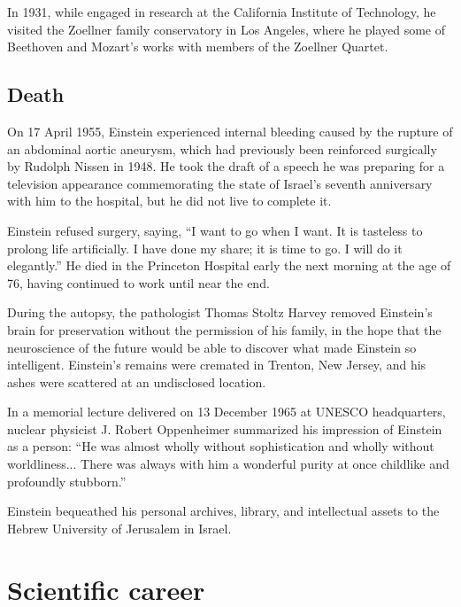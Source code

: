 \documentclass[twoside]{memoir}
\begin{document}
In 1931, while engaged in research at the California Institute of Technology,  he visited the Zoellner family conservatory in Los Angeles, where he played some of Beethoven and Mozart's works with members of the Zoellner Quartet.\cite{Times}

\chapter{Death}\label{death}

On 17 April 1955, Einstein experienced internal bleeding caused by the rupture of an abdominal aortic aneurysm, which had previously been reinforced surgically by Rudolph Nissen in 1948.\cite{BXLfp} He took the draft of a speech he was preparing for a television appearance commemorating the state of Israel's seventh anniversary with him to the hospital, but he did not live to complete it.\cite{QN45b}

Einstein refused surgery, saying, \enquote{I want to go when I want. It is tasteless to prolong life artificially. I have done my share; it is time to go. I will do it elegantly.}\cite{BhiNM} He died in the Princeton Hospital  early the next morning at the age of 76, having continued to work until near the end.\cite{YUhsl}

During the autopsy, the pathologist Thomas Stoltz Harvey  removed Einstein's brain  for preservation without the permission of his family, in the hope that the neuroscience of the future would be able to discover what made Einstein so intelligent.\cite{MqyYW} Einstein's remains were cremated in Trenton, New Jersey, and his ashes were scattered at an undisclosed location.\cite{GQrBZ}

In a memorial lecture delivered on 13 December 1965 at \acrshort{UNESCO}  headquarters, nuclear physicist J. Robert Oppenheimer  summarized his impression of Einstein as a person: \enquote{He was almost wholly without sophistication and wholly without worldliness... There was always with him a wonderful purity at once childlike and profoundly stubborn.}\cite{aJHxn}

Einstein bequeathed his personal archives, library, and intellectual assets to the Hebrew University of Jerusalem in Israel.

\part{Scientific career}\label{scientific-career}
\end{document}
